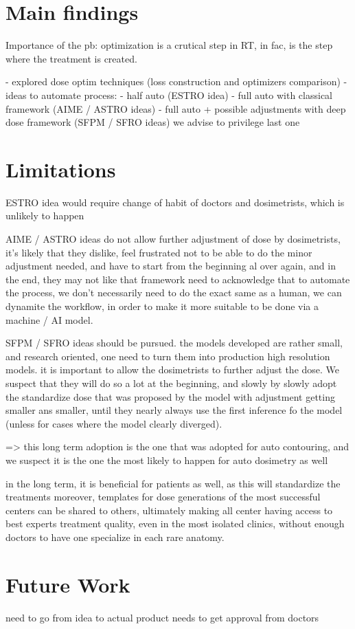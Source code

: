\section{Main findings}
Importance of the pb: optimization is a crutical step in RT, in fac, is the step where the treatment is created.

- explored dose optim techniques (loss construction and optimizers comparison)
- ideas to automate process:
  - half auto (ESTRO idea)
  - full auto with classical framework (AIME / ASTRO ideas)
  - full auto + possible adjustments with deep dose framework (SFPM / SFRO ideas)
we advise to privilege last one

\section{Limitations}

ESTRO idea would require change of habit of doctors and dosimetrists, which is unlikely to happen

AIME / ASTRO ideas do not allow further adjustment of dose by dosimetrists, it's likely that they dislike, feel frustrated not to be able to do the minor adjustment needed, and have to start from the beginning al over again, and in the end, they may not like that framework
need to acknowledge that to automate the process, we don't necessarily need to do the exact same as a human, we can dynamite the workflow, in order to make it more suitable to be done via a machine / AI model.

SFPM / SFRO ideas should be pursued.
the models developed are rather small, and research oriented, one need to turn them into production high resolution models.
it is important to allow the dosimetrists to further adjust the dose. We suspect that they will do so a lot at the beginning, and slowly by slowly adopt the standardize dose that was proposed by the model with adjustment getting smaller ans smaller, until they nearly always use the first inference fo the model (unless for cases where the model clearly diverged).

=> this long term adoption is the one that was adopted for auto contouring, and we suspect it is the one the most likely to happen for auto dosimetry as well

in the long term, it is beneficial for patients as well, as this will standardize the treatments
moreover, templates for dose generations of the most successful centers can be shared to others, ultimately making all center having access to best experts treatment quality, even in the most isolated clinics, without enough doctors to have one specialize in each rare anatomy.

\section{Future Work}

need to go from idea to actual product
needs to get approval from doctors
